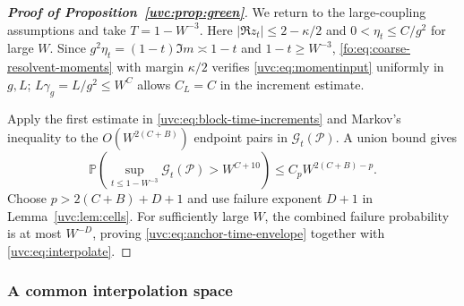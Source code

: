 \documentclass[11pt]{article}
\numberwithin{equation}{section}
\theoremstyle{remark}
\newcommand{\Prob}{\mathbb P}
\begin{document}
\begin{proof}[\textbf{Proof of Proposition~\ref{uvc:prop:green}}]
We return to the large-coupling assumptions and take $T=1-W^{-3}$.
Here $|\Re z_t|\le2-\kappa/2$ and $0<\eta_t\le C/g^2$ for large $W$.
Since $g^2\eta_t=(1-t)\Im m\asymp1-t$ and $1-t\ge W^{-3}$,
\eqref{fo:eq:coarse-resolvent-moments} with margin $\kappa/2$ verifies
\eqref{uvc:eq:momentinput} uniformly in $g,L$;
$L\gamma_g=L/g^2\le W^C$ allows $C_L=C$ in the increment estimate.

Apply the first estimate in \eqref{uvc:eq:block-time-increments} and
Markov's inequality to the $O(W^{2(C+B)})$ endpoint pairs
in $\mathcal G_t(\mathcal P)$. A union bound gives
\[
 \Prob\!\left(\sup_{t\le1-W^{-3}}\mathcal G_t(\mathcal P)>W^{C+10}\right)
 \le C_pW^{2(C+B)-p}.
\]
Choose $p>2(C+B)+D+1$ and use failure exponent $D+1$ in
Lemma~\ref{uvc:lem:cells}. For sufficiently large $W$, the combined
failure probability is at most $W^{-D}$, proving
\eqref{uvc:eq:anchor-time-envelope} together with
\eqref{uvc:eq:interpolate}.
\end{proof}

\subsubsection{A common interpolation space}
\label{sec:common-interpolation-proof}
\end{document}
